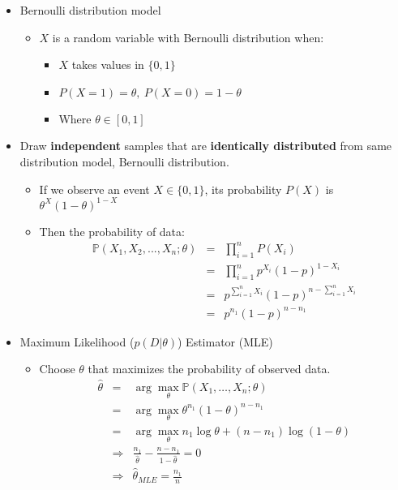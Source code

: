 \documentclass[letterpaper,10pt]{article}
\begin{document}
\begin{itemize}
	\item Bernoulli distribution model
	\begin{itemize}
		\item $X$ is a random variable with Bernoulli distribution when:
		\begin{itemize}
			\item $X$ takes values in $\{0,1\}$
			\item $P(X=1)=\theta,~P(X=0)=1-\theta$
			\item Where $\theta\in[0,1]$
		\end{itemize}
	\end{itemize}
	\item Draw \textbf{independent} samples that are \textbf{identically distributed} from same distribution model, Bernoulli distribution.
	\begin{itemize}
		\item If we observe an event $X\in\{0,1\}$, its probability $P(X)$ is $\theta^X(1-\theta)^{1-X}$
		\item Then the probability of data:
		\begin{equation}
		\begin{array}{rcl}
			\mathbb{P}(X_1,X_2,...,X_n;\theta) & = & \prod_{i=1}^{n}{P(X_i)} \\
											   & = & \prod_{i=1}^{n}{p^{X_i}(1-p)^{1-X_i}} \\
											   & = & p^{\sum_{i=1}^{n}{X_i}}(1-p)^{n-\sum_{i=1}^{n}{X_i}} \\
											   & = & p^{n_1}(1-p)^{n-n_1}
		\end{array}
		\end{equation}
	\end{itemize}
	\item Maximum Likelihood ($p(D|\theta)$) Estimator (MLE)
	\begin{itemize}
		\item Choose $\theta$ that maximizes the probability of observed data.
		\begin{equation}
		\begin{array}{rcl}
		\hat{\theta} & = & \arg\max_\theta{\mathbb{P}(X_1,\dots,X_n;\theta)} \\
					 & = & \arg\max_\theta{\theta^{n_1}(1-\theta)^{n-n_1}} \\
					 & = & \arg\max_\theta{n_1\log\theta+(n-n_1)\log(1-\theta)}\\
					 & \Rightarrow & \frac{n_1}{\hat{\theta}}-\frac{n-n_1}{1-\hat{\theta}} = 0 \\
					 & \Rightarrow & \hat{\theta}_{MLE} = \frac{n_1}{n}
		\end{array}
		\end{equation}
	\end{itemize}
\end{itemize}
\end{document}
